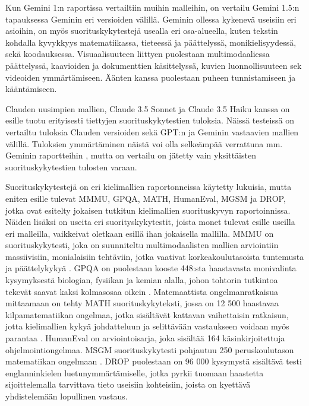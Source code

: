 Kun Gemini 1:n raportissa \parencite{googleDeepmindGeminiv1report} vertailtiin
muihin malleihin, on vertailu Gemini 1.5:n
\parencite{googleDeepmindGeminiv1report} tapauksessa Geminin eri versioiden
välillä. Geminin ollessa kykenevä useisiin eri asioihin, on myös
suorituskykytestejä usealla eri osa-alueella, kuten tekstin kohdalla
kyvykkyys matematiikassa, tieteessä ja päättelyssä, monikielisyydessä,
sekä koodauksessa. Visuaalisuuteen liittyen puolestaan multimodaaliessa
päättelyssä, kaavioiden ja dokumenttien käsittelyssä, kuvien luonnollisuuteen
sek videoiden ymmärtämiseen. Äänten kanssa puolestaan puheen tunnistamiseen ja
kääntämiseen.

Clauden uusimpien mallien, Claude 3.5 Sonnet ja Claude 3.5 Haiku kanssa on
esille tuotu erityisesti tiettyjen suorituskykytestien tuloksia. Näissä
testeissä on vertailtu tuloksia Clauden versioiden sekä GPT:n ja Geminin
vastaavien mallien välillä. \parencite{anthropicClaudeSonnetAndHaiku35}
\parencite{anthropicClaudeSonnet} \parencite{anthropicClaudeHaiku} Tuloksien
ymmärtäminen näistä voi olla selkeämpää verrattuna mm. Geminin raportteihin
\parencite{googleDeepmindGeminiv1report}
\parencite{googleDeepmindGeminiv1_5report}, mutta on vertailu on jätetty vain
yksittäisten suorituskykytestien tulosten varaan.

Suorituskykytestejä on eri kielimallien raportonneissa
\parencite{anthropicClaudeSonnetAndHaiku35} \parencite{openAI2023GPT4}
\parencite{openAIGPT4o} \parencite{googleDeepmindGeminiv1_5report} käytetty
lukuisia, mutta eniten esille tulevat MMMU, GPQA, MATH, HumanEval, MGSM ja
DROP, jotka ovat esitelty jokaisen tutkitun kielimallien suorituskyvyn
raportoinnissa. Näiden lisäksi on useita eri suorityskykytestit, joista monet
tulevat esille useilla eri malleilla, vaikkeivat oletkaan esillä ihan
jokaisella mallilla. MMMU on suorituskykytesti, joka on suunniteltu
multimodaalisten mallien arviointiin massiivisiin, monialaisiin tehtäviin,
jotka vaativat korkeakoulutasoista tuntemusta ja päättelykykyä
\parencite{benchmarkMMMU}. GPQA on puolestaan kooste 448:sta haastavasta
monivalinta kysymyksestä biologian, fysiikan ja kemian alalla, johon tohtorin
tutkintoa tekevät saavat kaksi kolmasosaa oikein \parencite{benchmarkGPQA}.
Matemaattista ongelmanratkaisua mittaamaan on tehty MATH suorituskykyteksti,
jossa on 12 500 haastavaa kilpamatematiikan ongelmaa, jotka sisältävät
kattavan vaihettaisin ratkaisun, jotta kielimallien kykyä johdatteluun ja
selittävään vastaukseen voidaan myös parantaa \parencite{benchmarkMATH}.
HumanEval \parencite{benchmarkHumanEval} on arviointoisarja, joka sisältää
164 käsinkirjoitettuja ohjelmointiongelmaa. MSGM suorituskykytesti pohjautuu
250 peruskoulutason matematiikan ongelmaan \parencite{benchmarkMSGM}. DROP
puolestaan on 96 000 kysymystä sisältävä testi englanninkielen
luetunymmärtämiselle, jotka pyrkii tuomaan haastetta sijoittelemalla
tarvittava tieto useisiin kohteisiin, joista on kyettävä yhdistelemään
lopullinen vastaus.

